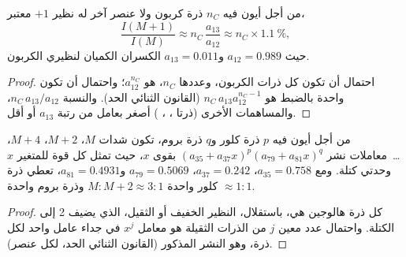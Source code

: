 \begin{proposition}[القمة $M+1$]\label{prop:b2:mass-spec-atomic:m-plus-one}
من أجل أيون فيه $n_C$ ذرة كربون ولا عنصر آخر له نظير $+1$ معتبر،
\begin{equation*}
\frac{I(M+1)}{I(M)} \approx n_C\,\frac{a_{13}}{a_{12}} \approx n_C \times 1.1~\%,
\end{equation*}
حيث $a_{12} = 0.989$ و$a_{13} = 0.011$ الكسران الكميان لنظيري الكربون.
\end{proposition}

\begin{proof}
احتمال أن تكون كل ذرات الكربون، وعددها $n_C$،  هو $a_{12}^{n_C}$؛ واحتمال أن تكون واحدة بالضبط
 هو $n_C\,a_{13}a_{12}^{n_C - 1}$ (القانون الثنائي الحد). والنسبة $n_C\,a_{13}/a_{12}$، 
والمساهمات الأخرى (ذرتا ، ، ) أصغر بعامل من رتبة
$a_{13}$ أو أقل.
\end{proof}

\begin{proposition}\label{prop:b2:mass-spec-atomic:halogen-patterns}
من أجل أيون فيه $p$ ذرة كلور و$q$ ذرة بروم، تكون شدات $M$، $M+2$، $M+4$، \dots\
معاملات نشر $(a_{35} + a_{37}x)^p(a_{79} + a_{81}x)^q$ بقوى $x$، حيث تمثل كل
قوة للمتغير $x$ وحدتي كتلة. ومع $a_{35} = 0.758$، $a_{37} = 0.242$، $a_{79} = 0.5069$ 
و$a_{81} = 0.4931$، تعطي ذرة كلور واحدة $M : M+2 \approx 3 : 1$ وذرة بروم واحدة $\approx 1 : 1$.
\end{proposition}

\begin{proof}
كل ذرة هالوجين هي، باستقلال، النظير الخفيف أو الثقيل، الذي يضيف 2 إلى الكتلة. 
واحتمال عدد معين $j$ من الذرات الثقيلة هو معامل $x^j$ في جداء عامل واحد
لكل ذرة، وهو النشر المذكور (القانون الثنائي الحد، لكل عنصر).
\end{proof}

